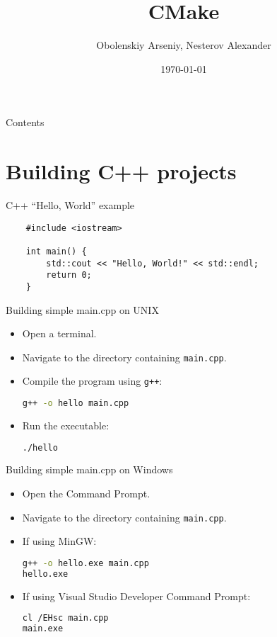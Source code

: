 \documentclass{beamer}
\title[CMake]{CMake}
\author{Obolenskiy Arseniy, Nesterov Alexander}
\institute{ITLab}
\date{\today}
\begin{document}
\begin{frame}
    \titlepage%
\end{frame}

\begin{frame}{Contents}
    \tableofcontents
\end{frame}

\section{Building C++ projects}

\begin{frame}[fragile]{C++ ``Hello, World'' example}
  \lstset{style=CStyle, caption=Hello World example}
  \begin{lstlisting}
    #include <iostream>

    int main() {
        std::cout << "Hello, World!" << std::endl;
        return 0;
    }
  \end{lstlisting}
\end{frame}

\begin{frame}[fragile]{Building simple main.cpp on UNIX}
  \begin{itemize}
    \item Open a terminal.
    \item Navigate to the directory containing \texttt{main.cpp}.
    \item Compile the program using \texttt{g++}:
    \begin{lstlisting}[language=bash]
g++ -o hello main.cpp
    \end{lstlisting}
    \item Run the executable:
    \begin{lstlisting}[language=bash]
./hello
    \end{lstlisting}
  \end{itemize}
\end{frame}

\begin{frame}[fragile]{Building simple main.cpp on Windows}
  \begin{itemize}
    \item Open the Command Prompt.
    \item Navigate to the directory containing \texttt{main.cpp}.
    \item If using MinGW\@:
    \begin{lstlisting}[language=bash]
g++ -o hello.exe main.cpp
hello.exe
    \end{lstlisting}
    \item If using Visual Studio Developer Command Prompt:
    \begin{lstlisting}[language=bash]
cl /EHsc main.cpp
main.exe
    \end{lstlisting}
  \end{itemize}
\end{frame}
\end{document}

